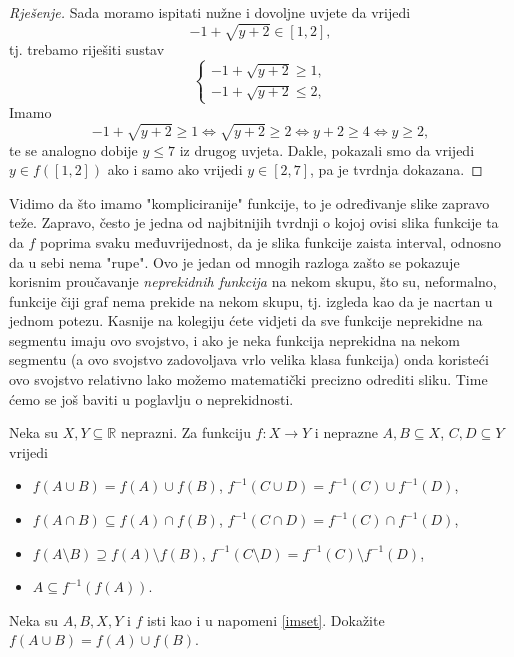 \begin{proof}[Rješenje]
Sada moramo ispitati nužne i dovoljne uvjete da vrijedi $$-1+\sqrt{y+2}\in [1, 2],$$
tj. trebamo riješiti sustav
$$\begin{cases}
-1+\sqrt{y+2}\geq 1,\\
-1+\sqrt{y+2}\leq 2,
\end{cases}$$
Imamo
$$-1+\sqrt{y+2}\geq 1\Leftrightarrow \sqrt{y+2}\geq 2\Leftrightarrow y+2\geq 4\Leftrightarrow y\geq 2,$$
te se analogno dobije $y\leq 7$ iz drugog uvjeta. Dakle, pokazali smo da vrijedi $y\in f([1, 2])$ ako i samo ako vrijedi $y\in [2, 7]$, pa je tvrdnja dokazana.
\end{proof}
\begin{remark}
Vidimo da što imamo "kompliciranije" funkcije, to je određivanje slike zapravo teže. Zapravo, često je jedna od najbitnijih tvrdnji o kojoj ovisi slika funkcije ta da $f$ poprima svaku međuvrijednost, da je slika funkcije zaista interval, odnosno da u sebi nema "rupe". Ovo je jedan od mnogih razloga zašto se pokazuje korisnim proučavanje \textit{neprekidnih funkcija} na nekom skupu, što su, neformalno, funkcije čiji graf nema prekide na nekom skupu, tj. izgleda kao da je nacrtan u jednom potezu. Kasnije na kolegiju ćete vidjeti da sve funkcije neprekidne na segmentu imaju ovo svojstvo, i ako je neka funkcija neprekidna na nekom segmentu (a ovo svojstvo zadovoljava vrlo velika klasa funkcija) onda koristeći ovo svojstvo relativno lako možemo matematički precizno odrediti sliku. Time ćemo se još baviti u poglavlju o neprekidnosti.
\end{remark}
\newpage
\begin{remark}
\label{imset}
Neka su $X,Y\subseteq \mathbb{R}$ neprazni. Za funkciju $f : X\to Y$ i neprazne $A, B\subseteq X$, $C, D\subseteq Y$ vrijedi
\begin{itemize}
\item $f(A\cup B)=f(A)\cup f(B)$, \hspace{0.5cm} $f^{-1}(C\cup D)=f^{-1}(C)\cup f^{-1}(D)$,
\item $f(A\cap B)\subseteq f(A)\cap f(B)$, \hspace{0.5cm} $f^{-1}(C\cap D)=f^{-1}(C)\cap f^{-1}(D)$,
\item $f\left(A\setminus B\right)\supseteq f(A)\setminus f(B)$, \hspace{0.5cm} $f^{-1}\left(C\setminus D\right)=f^{-1}(C)\setminus f^{-1}(D)$,
\item $A\subseteq f^{-1}(f(A))$.
\end{itemize}
\end{remark}
\begin{exercise}
Neka su $A, B, X, Y$ i $f$ isti kao i u napomeni \ref{imset}. Dokažite $f(A\cup B)=f(A)\cup f(B)$.
\end{exercise}
